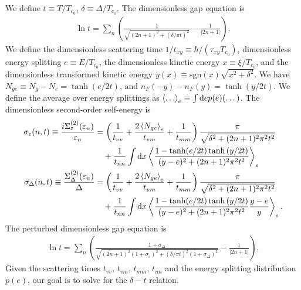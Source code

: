 \documentclass[aps,prl,preprint]{revtex4-2}
\begin{document}
We define $t \equiv T/T_{c_0}$, $\delta \equiv \Delta/T_{c_0}$. The
dimensionless gap equation is
\begin{align}
    \ln{t} = \sum_n\left(\frac{1}{\sqrt{(2n+1)^2 + (\delta/\pi t)^2}} - \frac{1}{|2n+1|}\right).
\end{align}
We define the dimensionless scattering time $1/t_{xy} \equiv \hbar/(\tau_{xy}T_{c_0})$,
dimensionless energy splitting $e \equiv E/T_{c_0}$,
the dimensionless kinetic energy $x \equiv \xi/T_{c_0}$,
and the dimensionless transformed kinetic energy $y(x) \equiv \text{sgn}(x)\sqrt{x^2 + \delta^2}$.
We have $N_{ge} \equiv N_g - N_e = \tanh(e/2t)$, and $n_F(-y) - n_F(y) = \tanh(y/2t)$.
We define the average over energy splittings as $\ev{\dots}_e \equiv \int\dd e p(e)(\dots)$.
The dimensionless second-order self-energy is
\begin{align}
    \sigma_\varepsilon(n,t) \equiv \frac{i\Sigma^{(2)}_\varepsilon(\varepsilon_n)}{\varepsilon_n} & = \left(\frac{1}{t_{vv}} + \frac{2\ev{N_{ge}}_e}{t_{vm}} + \frac{1}{t_{mm}}\right)\frac{\pi}{\sqrt{\delta^2+(2n+1)^2\pi^2t^2}}   \nonumber \\
                                                                                                  & \quad + \frac{1}{t_{nn}}\int\dd x\ev{\frac{1-\tanh(e/2t)\tanh{(y/2t)}}{(y-e)^2 + (2n+1)^2\pi^2t^2}}_e                                      \\
    \sigma_\Delta(n,t) \equiv \frac{\Sigma^{(2)}_\Delta(\varepsilon_n)}{\Delta}                   & = \left(\frac{1}{t_{vv}} + \frac{2\ev{N_{ge}}_e}{t_{vm}} + \frac{1}{t_{mm}}\right)\frac{\pi}{\sqrt{\delta^2+(2n+1)^2\pi^2t^2}}   \nonumber \\
                                                                                                  & \quad + \frac{1}{t_{nn}}\int\dd x\ev{\frac{1-\tanh(e/2t)\tanh{(y/2t)}}{(y-e)^2 + (2n+1)^2\pi^2t^2}\frac{y-e}{y}}_e.
\end{align}
The perturbed dimensionless gap equation is
\begin{align}
    \ln{t} = \sum_n\left(\frac{1 + \sigma_\Delta}{\sqrt{(2n+1)^2(1 + \sigma_\varepsilon)^2 + (\delta/\pi t)^2(1 + \sigma_\Delta)^2}} - \frac{1}{|2n+1|}\right).
\end{align}
Given the scattering times $t_{vv}$, $t_{vm}$, $t_{mm}$, $t_{nn}$ and the energy splitting distribution $p(e)$, our goal is to solve for the $\delta - t$ relation.
\end{document}
